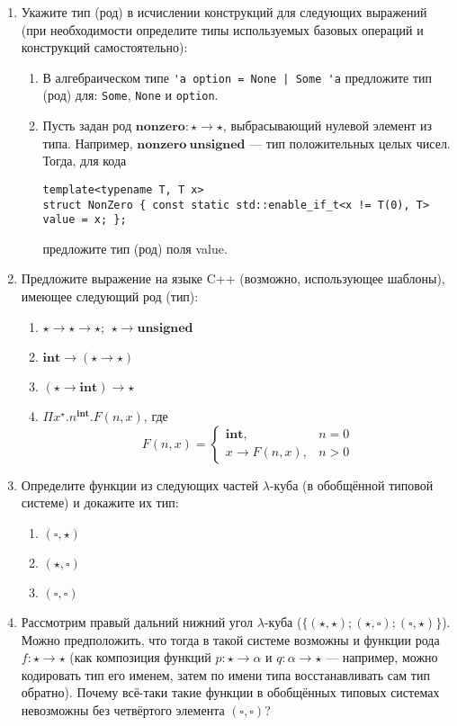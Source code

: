 \documentclass[10pt,a4paper,oneside]{article}
\begin{document}
\begin{enumerate}
\item Укажите тип (род) в исчислении конструкций для следующих выражений (при необходимости определите
типы используемых базовых операций и конструкций самостоятельно):
\begin{enumerate}
\item В алгебраическом типе \verb!'a option = None | Some 'a! предложите тип (род) для: \verb!Some!,
\verb!None! и \verb!option!.
\item Пусть задан род $\textbf{nonzero}: \star\rightarrow\star$, выбрасывающий нулевой элемент из
типа. Например, $\textbf{nonzero}\ \textbf{unsigned}$ --- тип положительных целых чисел.
Тогда, для кода
\begin{verbatim}
template<typename T, T x>
struct NonZero { const static std::enable_if_t<x != T(0), T> value = x; };
\end{verbatim}
предложите тип (род) поля value.
\end{enumerate}

\item Предложите выражение на языке C++ (возможно, использующее шаблоны), имеющее следующий род (тип):
\begin{enumerate}
\item $\star\rightarrow\star\rightarrow\star$; $\ \star\rightarrow\textbf{unsigned}$
\item $\textbf{int}\rightarrow(\star\rightarrow\star)$
\item $(\star\rightarrow\textbf{int})\rightarrow\star$
\item $\Pi x^\star.n^\textbf{int}.F(n,x)$, где $$F(n,x) = \left\{\begin{array}{ll}\textbf{int}, & n = 0\\
                                   x\rightarrow F(n,x), & n > 0\end{array}\right.$$
\end{enumerate}

\item Определите функции из следующих частей $\lambda$-куба (в обобщённой типовой системе) и докажите их тип:
\begin{enumerate}
\item $(\square,\star)$
\item $(\star,\square)$
\item $(\square,\square)$
\end{enumerate}

\item Рассмотрим правый дальний нижний угол $\lambda$-куба ($\{(\star,\star);(\star,\square);(\square,\star)\}$).
Можно предположить, что тогда в такой системе возможны и функции рода $f: \star\rightarrow\star$ 
(как композиция функций $p: \star\rightarrow\alpha$ и $q: \alpha\rightarrow\star$ ---
например, можно кодировать тип его именем, затем по имени типа восстанавливать сам тип обратно).
Почему всё-таки такие функции в обобщённых типовых системах невозможны без четвёртого элемента $(\square,\square)$?


\end{enumerate}
\end{document}
